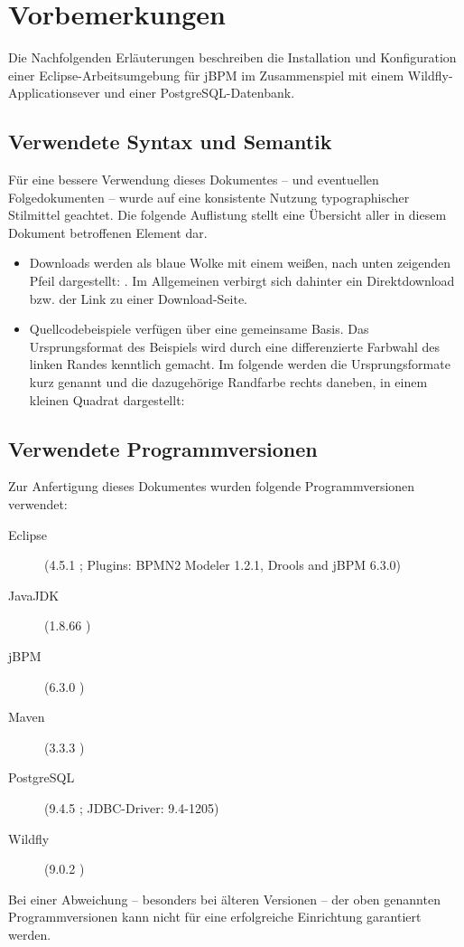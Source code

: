 \section{Vorbemerkungen}
Die Nachfolgenden Erläuterungen beschreiben die Installation und Konfiguration einer Eclipse-Arbeitsumgebung für jBPM im Zusammenspiel mit einem Wildfly-Applicationsever und einer PostgreSQL-Datenbank.
\subsection{Verwendete Syntax und Semantik}
Für eine bessere Verwendung dieses Dokumentes -- und eventuellen Folgedokumenten -- wurde auf eine konsistente Nutzung typographischer Stilmittel geachtet. Die folgende Auflistung stellt eine Übersicht aller in diesem Dokument betroffenen Element dar.

\begin{itemize}
	\item Downloads werden als blaue Wolke mit einem weißen, nach unten zeigenden Pfeil dargestellt: . Im Allgemeinen verbirgt sich dahinter ein Direktdownload bzw. der Link zu einer Download-Seite.
	\item Quellcodebeispiele verfügen über eine gemeinsame Basis. Das Ursprungsformat des Beispiels wird durch eine differenzierte Farbwahl des linken Randes kenntlich gemacht. Im folgende werden die Ursprungsformate kurz genannt und die dazugehörige Randfarbe rechts daneben, in einem kleinen Quadrat dargestellt:
\end{itemize}
\subsection{Verwendete Programmversionen}
Zur Anfertigung dieses Dokumentes wurden folgende Programmversionen verwendet:
\begin{description}
	\item[Eclipse] (4.5.1 ; Plugins: BPMN2 Modeler 1.2.1, Drools and jBPM 6.3.0)
	\item[JavaJDK] (1.8.66 ) 
	\item[jBPM] (6.3.0 )
	\item[Maven] (3.3.3 )
	\item[PostgreSQL] (9.4.5 ; JDBC-Driver: 9.4-1205)
	\item[Wildfly] (9.0.2 )
\end{description}
Bei einer Abweichung -- besonders bei älteren Versionen -- der oben genannten Programmversionen kann nicht für eine erfolgreiche Einrichtung garantiert werden.

